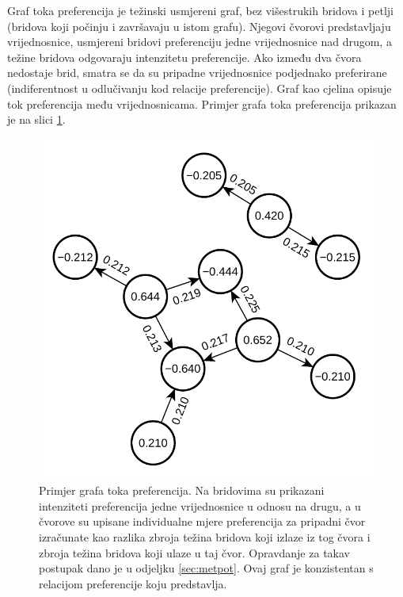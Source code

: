 \documentclass[lmodern, utf8, diplomski, numeric]{fer}
\begin{document}
  
  Graf toka preferencija je težinski usmjereni graf, bez višestrukih bridova i petlji (bridova koji počinju i završavaju u istom grafu).
  Njegovi čvorovi predstavljaju vrijednosnice, usmjereni bridovi preferenciju jedne vrijednosnice nad drugom, a težine bridova odgovaraju intenzitetu preferencije.
  Ako između dva čvora nedostaje brid, smatra se da su pripadne vrijednosnice podjednako preferirane (indiferentnost u odlučivanju kod relacije preferencije).
  Graf kao cjelina opisuje tok preferencija među vrijednosnicama.
  Primjer grafa toka preferencija prikazan je na slici \ref{fig:graph}.
  
  \begin{figure}[h]
    \centering
    \includegraphics[width=0.65\columnwidth]{graphics/pref-flow-graph.pdf}
    \caption{Primjer grafa toka preferencija. Na bridovima su prikazani intenziteti preferencija jedne vrijednosnice u odnosu na drugu, a u čvorove su upisane individualne mjere preferencija za pripadni čvor izračunate kao razlika zbroja težina bridova koji izlaze iz tog čvora i zbroja težina bridova koji ulaze u taj čvor. Opravdanje za takav postupak dano je u odjeljku \ref{sec:metpot}. Ovaj graf je konzistentan s relacijom preferencije koju predstavlja.}
    \label{fig:graph}
  \end{figure}
  
\end{document}
